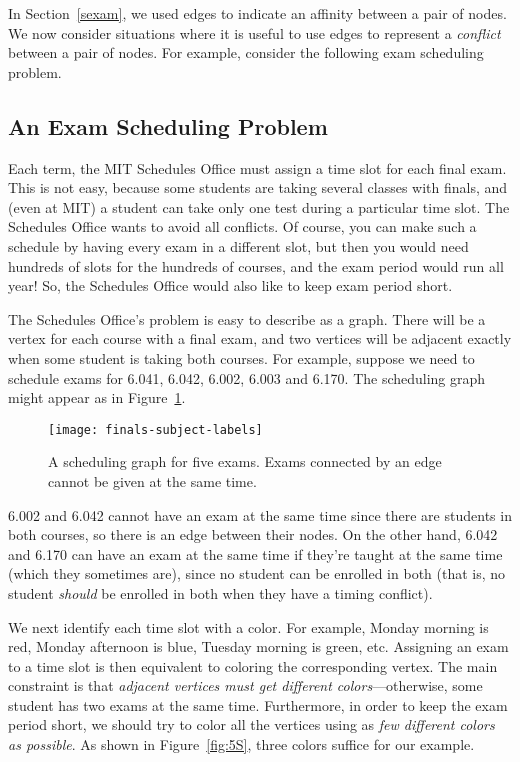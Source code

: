 In Section~\ref{sexam}, we used edges to indicate an affinity between
a pair of nodes.  We now consider situations where it is useful to use
edges to represent a \emph{conflict} between a pair of nodes.  For
example, consider the following exam scheduling problem.

\subsection{An Exam Scheduling Problem}

Each term, the MIT Schedules Office must assign a time slot for each
final exam.  This is not easy, because some students are taking
several classes with finals, and (even at MIT) a student can take only
one test during a particular time slot.  The Schedules Office wants to
avoid all conflicts.  Of course, you can make such a schedule by
having every exam in a different slot, but then you would need
hundreds of slots for the hundreds of courses, and the exam period
would run all year!  So, the Schedules Office would also like to keep
exam period short.

The Schedules Office's problem is easy to describe as a graph.  There
will be a vertex for each course with a final exam, and two vertices
will be adjacent exactly when some student is taking both courses.
For example, suppose we need to schedule exams for 6.041, 6.042,
6.002, 6.003 and 6.170.  The scheduling graph might appear as in
Figure~\ref{fig:5R}.

\begin{figure}

\texttt{[image: finals-subject-labels]}

\caption{A scheduling graph for five exams.  Exams connected by an
  edge cannot be given at the same time.}

\label{fig:5R}

\end{figure}

6.002 and 6.042 cannot have an exam at the same time since there are
students in both courses, so there is an edge between their nodes.  On the
other hand, 6.042 and 6.170 can have an exam at the same time if they're
taught at the same time (which they sometimes are), since no student can
be enrolled in both (that is, no student \emph{should} be enrolled in both
when they have a timing conflict).

We next identify each time slot with a color.  For example, Monday
morning is red, Monday afternoon is blue, Tuesday morning is green,
etc.  Assigning an exam to a time slot is then equivalent to coloring
the corresponding vertex.  The main constraint is that \emph{adjacent
  vertices must get different colors}---otherwise, some student has
two exams at the same time.  Furthermore, in order to keep the exam
period short, we should try to color all the vertices using as
\emph{few different colors as possible}.  As shown in Figure~\ref{fig:5S},
three colors suffice for our example.

